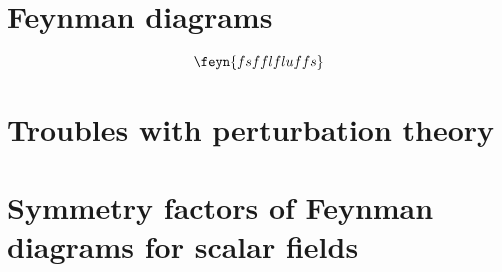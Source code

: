 \section{Feynman diagrams}

\begin{dmath}
   \feyn{fs f fl flu f fs}
\end{dmath}

\section{Troubles with perturbation theory}

\section{Symmetry factors of Feynman diagrams for scalar fields}

